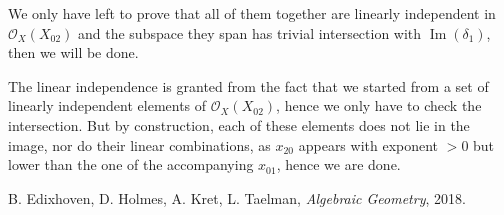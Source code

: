 \documentclass{article}
\DeclareMathOperator{\Ima}{Im}
\begin{document}
We only have left to prove that all of them together are linearly independent in $\mathcal{O}_X(X_{02})$ and the subspace they span has trivial intersection with $\Ima(\delta_1)$, then we will be done.

The linear independence is granted from the fact that we started from a set of linearly independent elements of $\mathcal{O}_X(X_{02})$, hence we only have to check the intersection. But by construction, each of these elements does not lie in the image, nor do their linear combinations, as $x_{20}$ appears with exponent $>0$ but lower than the one of the accompanying $x_{01}$, hence we are done.





\begin{thebibliography}{9}
	B. Edixhoven, D. Holmes, A. Kret, L. Taelman,
	\textit{Algebraic Geometry},
	2018.
\end{thebibliography}
\end{document}
